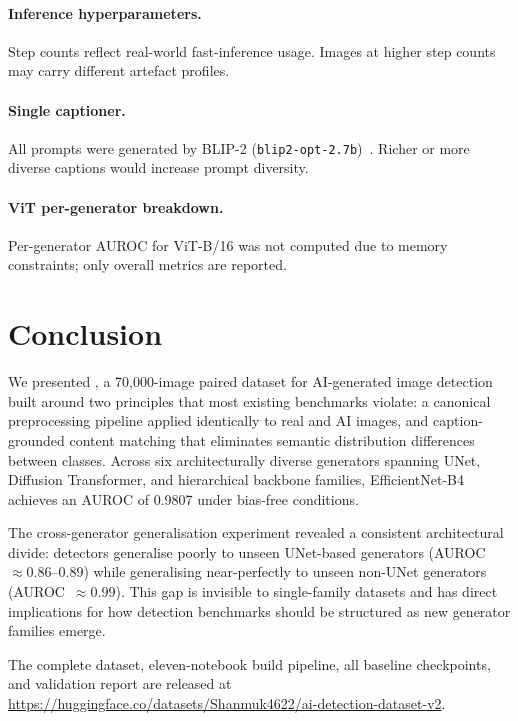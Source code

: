 \paragraph{Inference hyperparameters.}
Step counts reflect real-world fast-inference usage.
Images at higher step counts may carry different artefact profiles.

\paragraph{Single captioner.}
All prompts were generated by BLIP-2
(\texttt{blip2-opt-2.7b})~\cite{li2023blip2}.
Richer or more diverse captions would increase prompt diversity.

\paragraph{ViT per-generator breakdown.}
Per-generator AUROC for ViT-B/16 was not computed due to memory
constraints; only overall metrics are reported.


\section{Conclusion}
\label{sec:conclusion}

We presented \textbf{\datasetname}, a 70,000-image paired dataset for
AI-generated image detection built around two principles that most
existing benchmarks violate: a canonical preprocessing pipeline
applied identically to real and AI images, and caption-grounded
content matching that eliminates semantic distribution differences
between classes.
Across six architecturally diverse generators spanning UNet, Diffusion
Transformer, and hierarchical backbone families, EfficientNet-B4
achieves an AUROC of 0.9807 under bias-free conditions.

The cross-generator generalisation experiment revealed a consistent
architectural divide: detectors generalise poorly to unseen UNet-based
generators (AUROC~$\approx 0.86$--$0.89$) while generalising
near-perfectly to unseen non-UNet generators (AUROC~$\approx 0.99$).
This gap is invisible to single-family datasets and has direct
implications for how detection benchmarks should be structured as
new generator families emerge.

The complete dataset, eleven-notebook build pipeline, all baseline
checkpoints, and validation report are released at
\url{https://huggingface.co/datasets/Shanmuk4622/ai-detection-dataset-v2}.


